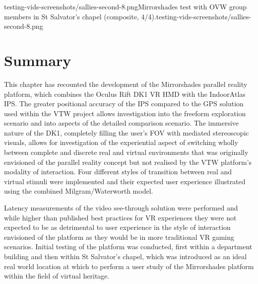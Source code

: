 
       {testing-vids-screenshots/sallies-second-8.png}{Mirrorshades test with OVW group members in St Salvator's chapel (composite, 4/4).}{testing-vids-screenshots/sallies-second-8.png}


\section{Summary}
This chapter has recounted the development of the Mirrorshades parallel reality platform, which combines the Oculus Rift DK1 VR HMD with the IndoorAtlas IPS. The greater positional accuracy of the IPS compared to the GPS solution used within the VTW project allows investigation into the freeform exploration scenario and into aspects of the detailed comparison scenario. The immersive nature of the DK1, completely filling the user's FOV with mediated stereoscopic visuals, allows for investigation of the experiential aspect of switching wholly between complete and discrete real and virtual environments that was originally envisioned of the parallel reality concept but not realised by the VTW platform's modality of interaction. Four different styles of transition between real and virtual stimuli were implemented and their expected user experience illustrated using the combined Milgram/Waterworth model.

Latency measurements of the video see-through solution were performed and while higher than published best practices for VR experiences they were not expected to be as detrimental to user experience in the style of interaction envisioned of the platform as they would be in more traditional VR gaming scenarios. Initial testing of the platform was conducted, first within a department building and then within St Salvator's chapel, which was introduced as an ideal real world location at which to perform a user study of the Mirrorshades platform within the field of virtual heritage.

